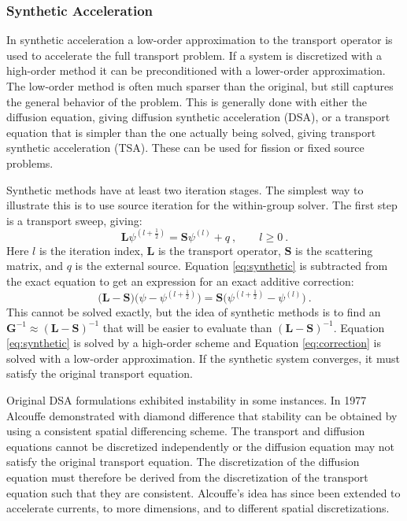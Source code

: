 \documentclass[12pt]{article}
\newcommand{\ve}[1]{\ensuremath{\mathbf{#1}}}
\begin{document}
\subsubsection*{Synthetic Acceleration}
In synthetic acceleration a low-order approximation to the transport operator is used to accelerate the full transport problem. %
If a system is discretized with a high-order method it can be preconditioned with a lower-order approximation. The low-order method is often much sparser than the original, but still captures the general behavior of the problem. %
This is generally done with either the diffusion equation, giving diffusion synthetic acceleration (DSA), or a transport equation that is simpler than the one actually being solved, giving transport synthetic acceleration (TSA). These can be used for fission or fixed source problems.%

Synthetic methods have at least two iteration stages. The simplest way to illustrate this is to use source iteration for the within-group solver. The first step is a transport sweep, giving:
%
\begin{equation}
  \ve{L}\psi^{(l+\frac{1}{2})} = \ve{S}\psi^{(l)} + q \:, \qquad l \ge 0 \:.
  \label{eq:synthetic}
\end{equation}
%
Here $l$ is the iteration index, $\ve{L}$ is the transport operator, $\ve{S}$ is the scattering matrix, and $q$ is the external source. Equation \eqref{eq:synthetic} is subtracted from the exact equation to get an expression for an exact additive correction:
%
\begin{equation}
  \bigl( \ve{L} - \ve{S} \bigr)\bigl( \psi - \psi^{(l+\frac{1}{2})} \bigr) = \ve{S}\bigl(\psi^{(l+\frac{1}{2})} - \psi^{(l)} \bigr) \:.
  \label{eq:correction}
\end{equation}
%
This cannot be solved exactly, but the idea of synthetic methods is to find an $\ve{G}^{-1} \approx (\ve{L} - \ve{S})^{-1}$ that will be easier to evaluate than $(\ve{L} - \ve{S})^{-1}$. Equation \eqref{eq:synthetic} is solved by a high-order scheme and Equation \eqref{eq:correction} is solved with a low-order approximation. If the synthetic system converges, it must satisfy the original transport equation.%

Original DSA formulations exhibited instability in some instances. In 1977 Alcouffe demonstrated with diamond difference that stability can be obtained by using a consistent spatial differencing scheme. %
The transport and diffusion equations cannot be discretized independently or the diffusion equation may not satisfy the original transport equation. The discretization of the diffusion equation must therefore be derived from the discretization of the transport equation such that they are consistent. Alcouffe's idea has since been extended to accelerate currents, to more dimensions, and to different spatial discretizations.%
\end{document}
